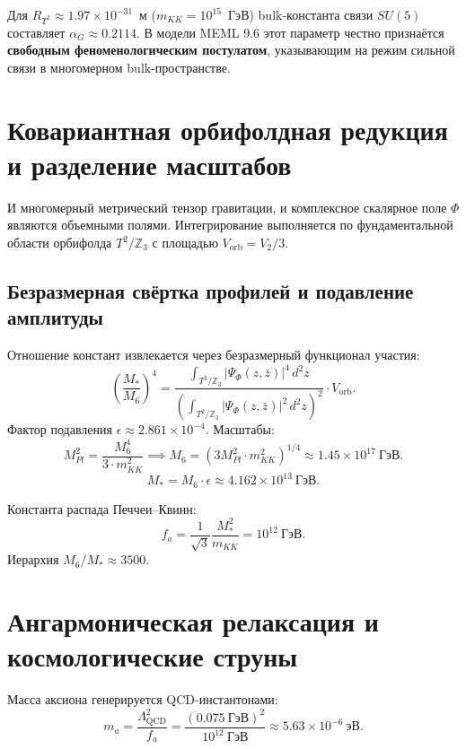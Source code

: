 \documentclass[12pt,a4paper]{article}
\begin{document}
Для $R_{T^2} \approx 1.97 \times 10^{-31}$~м ($m_{KK} = 10^{15}$~ГэВ) bulk-константа связи $SU(5)$ составляет $\alpha_G \approx 0.2114$. В модели MEML 9.6 этот параметр честно признаётся \textbf{свободным феноменологическим постулатом}, указывающим на режим сильной связи в многомерном bulk-пространстве.

\section{Ковариантная орбифолдная редукция и разделение масштабов}
И многомерный метрический тензор гравитации, и комплексное скалярное поле $\Phi$ являются объемными полями. Интегрирование выполняется по фундаментальной области орбифолда $T^2/\mathbb{Z}_3$ с площадью $V_{\text{orb}} = V_2/3$.

\subsection{Безразмерная свёртка профилей и подавление амплитуды}
Отношение констант извлекается через безразмерный функционал участия:
\begin{equation}
\left(\frac{M_*}{M_6}\right)^4 = \frac{\int_{T^2/\mathbb{Z}_3} |\Psi_{\Phi}(z,\bar{z})|^4 \, d^2z}{\left( \int_{T^2/\mathbb{Z}_3} |\Psi_{\Phi}(z,\bar{z})|^2 \, d^2z \right)^2} \cdot V_{\text{orb}}.
\label{eq:convol}
\end{equation}
Фактор подавления $\epsilon \approx 2.861 \times 10^{-4}$. Масштабы:
\begin{equation}
M_{Pl}^2 = \frac{M_6^4}{3 \cdot m_{KK}^2} \implies M_6 = \left(3 M_{Pl}^2 \cdot m_{KK}^2\right)^{1/4} \approx 1.45 \times 10^{17} \ \text{ГэВ}.
\end{equation}
\begin{equation}
M_* = M_6 \cdot \epsilon \approx 4.162 \times 10^{13} \ \text{ГэВ}.
\end{equation}

Константа распада Печчеи--Квинн:
\begin{equation}
\boxed{\; f_a = \frac{1}{\sqrt{3}} \frac{M_*^2}{m_{KK}} = 10^{12} \ \text{ГэВ}. \;}
\end{equation}
Иерархия $M_6 / M_* \approx 3500$.

\section{Ангармоническая релаксация и космологические струны}
Масса аксиона генерируется QCD-инстантонами:
\begin{equation}
m_a = \frac{\Lambda_{\text{QCD}}^2}{f_a} = \frac{(0.075 \ \text{ГэВ})^2}{10^{12} \ \text{ГэВ}} \approx 5.63 \times 10^{-6} \ \text{эВ}.
\end{equation}
\end{document}
